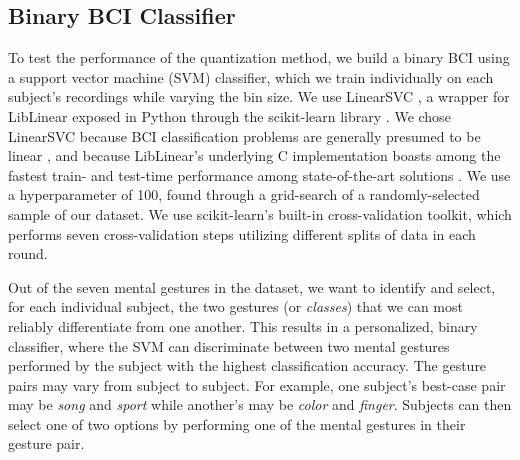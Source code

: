 \subsection{Binary BCI Classifier}

To test the performance of the quantization method, we build a binary BCI using a support vector machine (SVM) classifier, which we train individually on each subject's recordings while varying the bin size. We use LinearSVC \cite{fan_liblinear:_2008}, a wrapper for LibLinear exposed in Python through the scikit-learn library \cite{pedregosa_scikit-learn:_2011}. We chose LinearSVC because BCI classification problems are generally presumed to be linear  \cite{garrett_comparison_2003,lotte_review_2007}, and because LibLinear's underlying C implementation boasts among the fastest train- and test-time performance among state-of-the-art solutions \cite{fan_liblinear:_2008}. We use a hyperparameter of 100, found through a grid-search of a randomly-selected sample of our dataset. We use scikit-learn's built-in cross-validation toolkit, which performs seven cross-validation steps utilizing different splits of data in each round.

Out of the seven mental gestures in the dataset, we want to identify and select, for each individual subject, the two gestures (or \textit{classes}) that we can most reliably differentiate from one another. This results in a personalized, binary classifier, where the SVM can discriminate between two mental gestures performed by the subject with the highest classification accuracy. The gesture pairs may vary from subject to subject. For example, one subject's best-case pair may be \textit{song} and \textit{sport} while another's may be \textit{color} and \textit{finger}. Subjects can then select one of two options by performing one of the mental gestures in their gesture pair.
